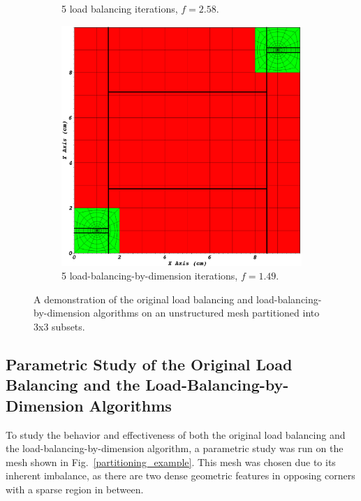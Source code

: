 \documentclass[times,final]{elsarticle}
\begin{document}
\begin{figure}[H]
\begin{subfigure}[b]{0.49\textwidth}
\caption{5 load balancing iterations, $f = 2.58$.}
\label{3x3_lb}
\end{subfigure}
\begin{subfigure}[b]{0.49\textwidth}
\centering
\includegraphics[scale=0.1]{../figures/ubp_3x3_lbd.png}
\caption{5 load-balancing-by-dimension iterations, $f = 1.49$.}
\label{3x3_lbd}
\end{subfigure}
\caption{A demonstration of the original load balancing and load-balancing-by-dimension algorithms on an unstructured mesh partitioned into 3x3 subsets.}
\label{alg_illustration}
\end{figure}

\subsection{Parametric Study of the Original Load Balancing and the Load-Balancing-by-Dimension Algorithms}
To study the behavior and effectiveness of both the original load balancing and the load-balancing-by-dimension algorithm, a parametric study was run on the mesh shown in Fig.~\ref{partitioning_example}.
This mesh was chosen due to its inherent imbalance, as there are two dense geometric features in opposing corners with a sparse region in between.
\end{document}

